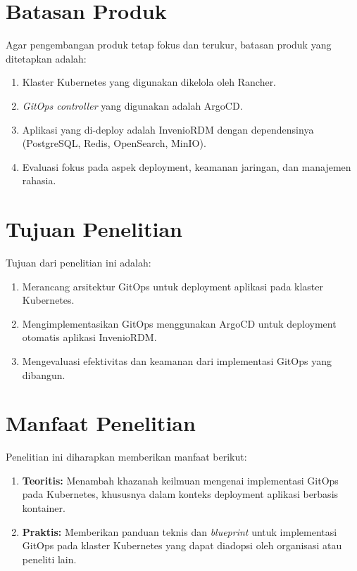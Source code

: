 \section{Batasan Produk}

Agar pengembangan produk tetap fokus dan terukur, batasan produk yang ditetapkan adalah:

\begin{enumerate}
  \item Klaster Kubernetes yang digunakan dikelola oleh Rancher.
  \item \textit{GitOps controller} yang digunakan adalah ArgoCD.
  \item Aplikasi yang di-deploy adalah InvenioRDM dengan dependensinya (PostgreSQL, Redis, OpenSearch, MinIO).
  \item Evaluasi fokus pada aspek deployment, keamanan jaringan, dan manajemen rahasia.
\end{enumerate}

\section{Tujuan Penelitian}

Tujuan dari penelitian ini adalah:

\begin{enumerate}
  \item Merancang arsitektur GitOps untuk deployment aplikasi pada klaster Kubernetes.
  \item Mengimplementasikan GitOps menggunakan ArgoCD untuk deployment otomatis aplikasi InvenioRDM.
  \item Mengevaluasi efektivitas dan keamanan dari implementasi GitOps yang dibangun.
\end{enumerate}

\section{Manfaat Penelitian}

Penelitian ini diharapkan memberikan manfaat berikut:

\begin{enumerate}
  \item \textbf{Teoritis:} Menambah khazanah keilmuan mengenai implementasi GitOps pada Kubernetes, khususnya dalam konteks deployment aplikasi berbasis kontainer.
  \item \textbf{Praktis:} Memberikan panduan teknis dan \textit{blueprint} untuk implementasi GitOps pada klaster Kubernetes yang dapat diadopsi oleh organisasi atau peneliti lain.
\end{enumerate}
